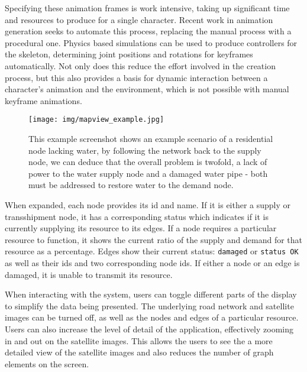 Specifying these animation frames is work intensive, taking up significant time and resources to produce for a single character.  Recent work in animation generation seeks to automate this process, replacing the manual process with a procedural one.  Physics based simulations can be used to produce controllers for the skeleton, determining joint positions and rotations for keyframes automatically.  Not only does this reduce the effort involved in the creation process, but this also provides a basis for dynamic interaction between a character's animation and the environment, which is not possible with manual keyframe animations.



\begin{figure}[htp] \centering
    \texttt{[image: img/mapview\_example.jpg]}
    \caption[Example Infrastructure Visualization]{This example screenshot shows an example scenario of a residential node lacking water,
    by following the network back to the supply node, we can deduce that the overall problem is twofold, a lack of power
    to the water supply node and a damaged water pipe - both must be addressed to restore water to the demand node.}
    \label{fig:mapview_example}
\end{figure}

When expanded, each node provides its id and name. If it is either a supply or transshipment node, it has a
corresponding status which indicates if it is currently supplying its resource to its edges. If a node requires a particular resource to function, it shows the current ratio of the supply and demand for that resource as a percentage. Edges show their current status: {\tt damaged} or {\tt status OK} as well as their ids and two corresponding node ids. If either a node or an edge is damaged, it is unable to transmit its resource.

When interacting with the system, users can toggle different parts of the display to simplify the data being presented. The underlying road network and satellite images can be turned off, as well as the nodes and edges of a particular resource. Users can also increase the level of detail of the application, effectively zooming in and out on the satellite images. This allows the users to see the a more detailed view of the satellite images and also reduces the number of graph elements on the screen. 

